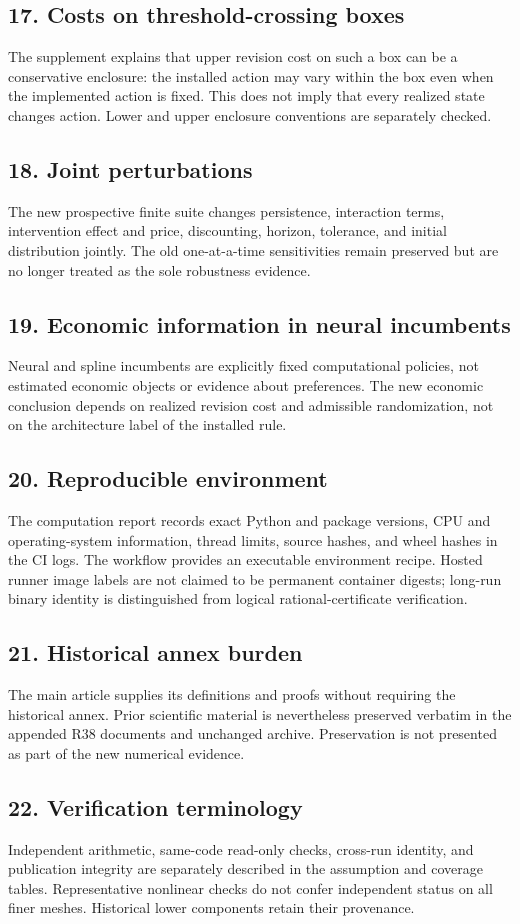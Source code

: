 \subsection{17. Costs on threshold-crossing boxes}
The supplement explains that upper revision cost on such a box can be a conservative enclosure: the installed action may vary within the box even when the implemented action is fixed. This does not imply that every realized state changes action. Lower and upper enclosure conventions are separately checked.
\subsection{18. Joint perturbations}
The new prospective finite suite changes persistence, interaction terms, intervention effect and price, discounting, horizon, tolerance, and initial distribution jointly. The old one-at-a-time sensitivities remain preserved but are no longer treated as the sole robustness evidence.
\subsection{19. Economic information in neural incumbents}
Neural and spline incumbents are explicitly fixed computational policies, not estimated economic objects or evidence about preferences. The new economic conclusion depends on realized revision cost and admissible randomization, not on the architecture label of the installed rule.
\subsection{20. Reproducible environment}
The computation report records exact Python and package versions, CPU and operating-system information, thread limits, source hashes, and wheel hashes in the CI logs. The workflow provides an executable environment recipe. Hosted runner image labels are not claimed to be permanent container digests; long-run binary identity is distinguished from logical rational-certificate verification.
\subsection{21. Historical annex burden}
The main article supplies its definitions and proofs without requiring the historical annex. Prior scientific material is nevertheless preserved verbatim in the appended R38 documents and unchanged archive. Preservation is not presented as part of the new numerical evidence.
\subsection{22. Verification terminology}
Independent arithmetic, same-code read-only checks, cross-run identity, and publication integrity are separately described in the assumption and coverage tables. Representative nonlinear checks do not confer independent status on all finer meshes. Historical lower components retain their provenance.
